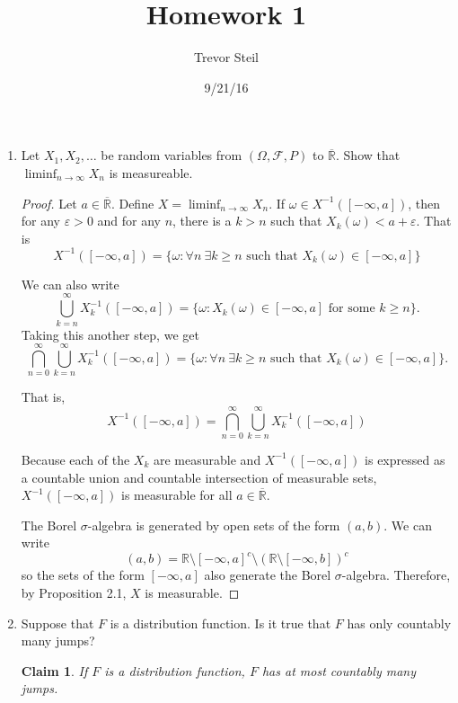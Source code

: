 \documentclass[a4paper]{article}
\title{Homework 1 }
\date{9/21/16}
\author{Trevor Steil}
\newtheorem*{claim}{Claim}
\newcommand{\R}{\mathbb{R}}
\begin{document}
\maketitle

\begin{enumerate}
  \item
    Let $X_1, X_2, \dots $ be random variables from $( \Omega, \mathcal{F}, P )$ to $\overline{ \R }$. Show that $\liminf_{n \to \infty} X_n$ is measureable.

    \begin{proof}

      Let $a \in \overline{\R}$. Define $X = \liminf_{n \to \infty} X_n$. If $\omega \in X^{-1}( [-\infty, a] )$, then for any $\varepsilon > 0$ and
      for any $n$, there is a $k > n$ such that $X_k(\omega) < a + \varepsilon$. That is
      \[ X^{-1} ( [- \infty, a] ) = \{ \omega : \forall n \ \exists k \geq n \text{ such that } X_k(\omega) \in [-\infty, a] \} \]

      We can also write
      \[ \bigcup_{k = n}^\infty X_k^{-1} ( [ -\infty, a ]) = \{ \omega : X_k(\omega) \in [-\infty, a] \text{ for some } k \geq n \} .\]
      Taking this another step, we get
      \[ \bigcap_{n=0}^\infty \bigcup_{k=n}^\infty X_k^{-1} ([-\infty, a]) = \{ \omega : \forall n \ \exists k \geq n \text{ such that } X_k(\omega) \in
      [-\infty, a] \} .\]

      That is,
      \[ X^{-1}( [-\infty, a] ) = \bigcap_{n=0}^\infty \bigcup_{k=n}^\infty X_k^{-1} ([-\infty, a]) \]

      Because each of the $X_k$ are measurable and $X^{-1}([-\infty, a])$ is expressed as a countable union and countable intersection of measurable
      sets, $X^{-1} ([-\infty, a])$ is measurable for all $a \in \overline{\R}$.

      The Borel $\sigma$-algebra is generated by open sets of the form $(a,b)$. We can write
      \[ (a,b) = \R \setminus [-\infty, a]^c \setminus \left( \R \setminus [-\infty,b] \right)^c \]
      so the sets of the form $[-\infty, a]$ also generate the Borel $\sigma$-algebra. Therefore, by Proposition 2.1, $X$ is measurable.

    \end{proof}

  \item
    Suppose that $F$ is a distribution function. Is it true that $F$ has only countably many jumps?

    \begin{claim}
      If $F$ is a distribution function, $F$ has at most countably many jumps.
    \end{claim}


\end{enumerate}
\end{document}

